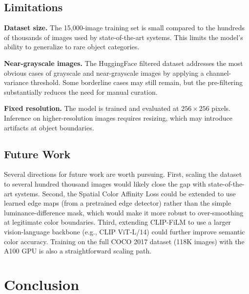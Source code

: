 \documentclass[12pt, a4paper, oneside]{report}
\begin{document}
\section{Limitations}

\textbf{Dataset size.} The 15,000-image training set is small compared to the
hundreds of thousands of images used by state-of-the-art systems. This limits the
model's ability to generalize to rare object categories.

\textbf{Near-grayscale images.} The HuggingFace filtered dataset addresses the
most obvious cases of grayscale and near-grayscale images by applying a
channel-variance threshold. Some borderline cases may still remain, but the
pre-filtering substantially reduces the need for manual curation.

\textbf{Fixed resolution.} The model is trained and evaluated at $256 \times 256$
pixels. Inference on higher-resolution images requires resizing, which may introduce
artifacts at object boundaries.

\section{Future Work}

Several directions for future work are worth pursuing. First, scaling the dataset
to several hundred thousand images would likely close the gap with state-of-the-art
systems. Second, the Spatial Color Affinity Loss could be extended to use learned
edge maps (from a pretrained edge detector) rather than the simple
luminance-difference mask, which would make it more robust to over-smoothing at
legitimate color boundaries. Third, extending CLIP-FiLM to use a larger
vision-language backbone (e.g., CLIP ViT-L/14) could further improve semantic
color accuracy. Training on the full COCO 2017 dataset (118K images) with the
A100 GPU is also a straightforward scaling path.


\chapter{Conclusion}
\label{ch:conclusion}
\end{document}
